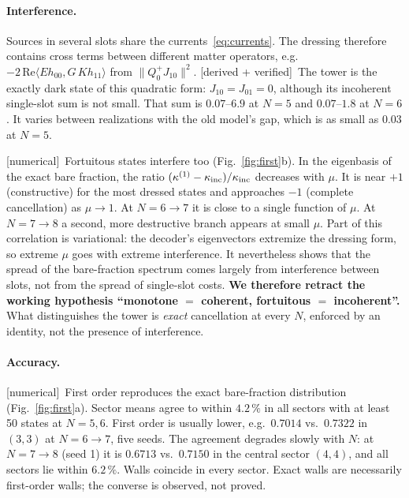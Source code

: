 \documentclass[11pt]{article}
\newcommand{\ip}[2]{\langle #1,#2\rangle}
\newcommand{\tagbox}[2]{\textsf{\small\color{#1}[#2]}}
\newcommand{\VER}{\tagbox{cder}{derived + verified}}
\newcommand{\NUM}{\tagbox{cnum}{numerical}}
\theoremstyle{plain}
\theoremstyle{remark}
\numberwithin{equation}{section}
\begin{document}
\paragraph{Interference.} Sources in several slots share the currents~\eqref{eq:currents}. The dressing therefore
contains cross terms between different matter operators, e.g.\ $-2\,\mathrm{Re}\ip{Eh_{00}}{G\,Kh_{11}}$ from
$\|Q_0^+J_{10}\|^2$. \VER\ The tower is the exactly dark state of this quadratic form: $J_{10}=J_{01}=0$, although its
incoherent single-slot sum is not small. That sum is $0.07$--$6.9$ at $N=5$ and $0.07$--$1.8$ at $N=6$. It varies
between realizations with the old model's gap, which is as small as $0.03$ at $N=5$.

\NUM\ Fortuitous states interfere too (Fig.~\ref{fig:first}b). In the eigenbasis of the exact bare fraction, the ratio
$(\kappa^{(1)}-\kappa_{\rm inc})/\kappa_{\rm inc}$ decreases with $\mu$. It is near $+1$ (constructive) for the most
dressed states and approaches $-1$ (complete cancellation) as $\mu\to1$. At $N=6\to7$ it is close to a single function
of $\mu$. At $N=7\to8$ a second, more destructive branch appears at small $\mu$. Part of this
correlation is variational: the decoder's eigenvectors extremize the dressing form, so extreme $\mu$ goes with extreme
interference. It nevertheless shows that the spread of the bare-fraction spectrum comes largely from interference between
slots, not from the spread of single-slot costs. \textbf{We therefore retract the working hypothesis ``monotone $=$
coherent, fortuitous $=$ incoherent''.} What distinguishes the tower is \emph{exact} cancellation at every $N$, enforced
by an identity, not the presence of interference.

\paragraph{Accuracy.} \NUM\ First order reproduces the exact bare-fraction distribution (Fig.~\ref{fig:first}a). Sector
means agree to within $4.2\,\%$ in all sectors with at least 50 states at $N=5,6$. First order is usually lower,
e.g.\ $0.7014$ vs.\ $0.7322$ in $(3,3)$ at $N=6\to7$, five seeds. The agreement degrades slowly with $N$: at $N=7\to8$
(seed 1) it is $0.6713$ vs.\ $0.7150$ in the central sector $(4,4)$, and all sectors lie within $6.2\,\%$. Walls coincide
in every sector. Exact walls are necessarily first-order walls; the converse is observed, not proved.
\end{document}
